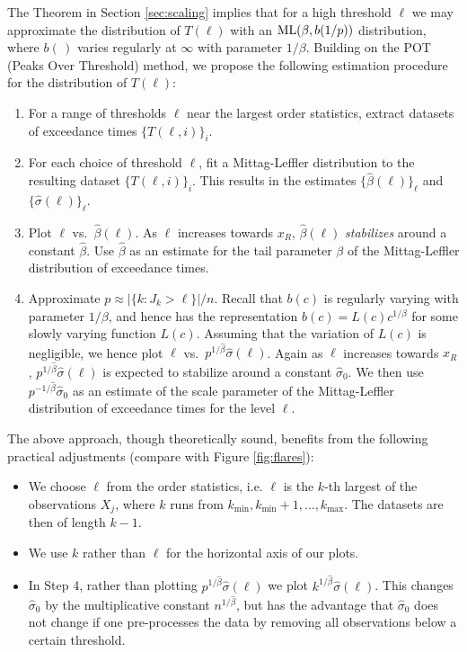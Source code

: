 \documentclass[smallextended]{svjour3}       %
\providecommand{\tightlist}{%
  \setlength{\itemsep}{0pt}\setlength{\parskip}{0pt}}
\begin{document}
The Theorem in Section \ref{sec:scaling} implies that for a high
threshold \(\ell\) we may approximate the distribution of \(T(\ell)\)
with an \({\rm ML}(\beta, b(1/p))\) distribution, where \(b(\,)\) varies
regularly at \(\infty\) with parameter \(1/\beta\). Building on the POT
(Peaks Over Threshold) method, we propose the following estimation
procedure for the distribution of \(T(\ell)\):

\begin{enumerate}
\def\labelenumi{\arabic{enumi}.}
\item
  For a range of thresholds \(\ell\) near the largest order statistics,
  extract datasets of exceedance times \(\{T(\ell, i)\}_i\).
\item
  For each choice of threshold \(\ell\), fit a Mittag-Leffler
  distribution to the resulting dataset \(\{T(\ell, i)\}_i\). This
  results in the estimates \(\{\hat\beta(\ell)\}_\ell\) and
  \(\{\hat \sigma(\ell)\}_\ell\).
\item
  Plot \(\ell\) vs.~\(\hat \beta(\ell)\). As \(\ell\) increases towards
  \(x_R\), \(\hat \beta(\ell)\) \emph{stabilizes} around a constant
  \(\hat \beta\). Use \(\hat \beta\) as an estimate for the tail
  parameter \(\beta\) of the Mittag-Leffler distribution of exceedance
  times.
\item
  Approximate \(p \approx |\{k: J_k > \ell\}| / n\). Recall that
  \(b(c)\) is regularly varying with parameter \(1/\beta\), and hence
  has the representation \(b(c) = L(c) c^{1/\beta}\) for some slowly
  varying function \(L(c)\). Assuming that the variation of \(L(c)\) is
  negligible, we hence plot \(\ell\)
  vs.~\(p^{1/\hat \beta} \hat \sigma(\ell)\). Again as \(\ell\)
  increases towards \(x_R\), \(p^{1/\hat \beta} \hat \sigma(\ell)\) is
  expected to stabilize around a constant \(\hat \sigma_0\). We then use
  \(p^{-1/\hat \beta} \hat \sigma_0\) as an estimate of the scale
  parameter of the Mittag-Leffler distribution of exceedance times for
  the level \(\ell\).
\end{enumerate}

The above approach, though theoretically sound, benefits from the
following practical adjustments (compare with Figure \ref{fig:flares}):

\begin{itemize}
\tightlist
\item
  We choose \(\ell\) from the order statistics, i.e. \(\ell\) is the
  \(k\)-th largest of the observations \(X_j\), where \(k\) runs from
  \(k_\text{min}, k_\text{min} + 1, \ldots, k_\text{max}\). The datasets
  are then of length \(k-1\).
\item
  We use \(k\) rather than \(\ell\) for the horizontal axis of our
  plots.
\item
  In Step 4, rather than plotting \(p^{1/\hat \beta} \hat \sigma(\ell)\)
  we plot \(k^{1/\hat \beta} \hat \sigma(\ell)\). This changes
  \(\hat \sigma_0\) by the multiplicative constant \(n^{1/\hat \beta}\),
  but has the advantage that \(\hat \sigma_0\) does not change if one
  pre-processes the data by removing all observations below a certain
  threshold.
\end{itemize}
\end{document}
